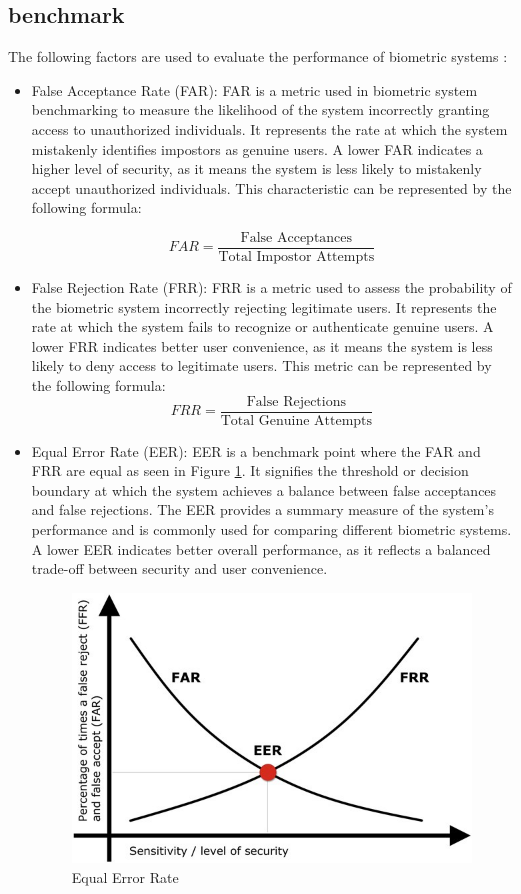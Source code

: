 \subsection{benchmark}

The following factors are used to evaluate the performance of biometric systems \cite{benchmarks}:

\begin{itemize}
	\item False Acceptance Rate (FAR):
	FAR is a metric used in biometric system benchmarking to measure the likelihood of the system incorrectly granting access to unauthorized individuals. It represents the rate at which the system mistakenly identifies impostors as genuine users. A lower FAR indicates a higher level of security, as it means the system is less likely to mistakenly accept unauthorized individuals. This characteristic can be represented by the following formula:

	\begin{equation}
		FAR = \frac{\text{False Acceptances}}{\text{Total Impostor Attempts}}
	\end{equation}
	
	\item False Rejection Rate (FRR):
	FRR is a metric used to assess the probability of the biometric system incorrectly rejecting legitimate users. It represents the rate at which the system fails to recognize or authenticate genuine users. A lower FRR indicates better user convenience, as it means the system is less likely to deny access to legitimate users. This metric can be represented by the following formula:
	\begin{equation}
		FRR = \frac{\text{False Rejections}}{\text{Total Genuine Attempts}}
	\end{equation}
	
	\item Equal Error Rate (EER):
	EER is a benchmark point where the FAR and FRR are equal as seen in Figure \ref{fig:eer}. It signifies the threshold or decision boundary at which the system achieves a balance between false acceptances and false rejections. The EER provides a summary measure of the system's performance and is commonly used for comparing different biometric systems. A lower EER indicates better overall performance, as it reflects a balanced trade-off between security and user convenience.
	\begin{figure}[h]
	    \centering
	    \includegraphics[width=0.7\linewidth]{images/eer}
	    \caption{Equal Error Rate \cite{eer}}
	    \label{fig:eer}
	\end{figure}
\end{itemize}